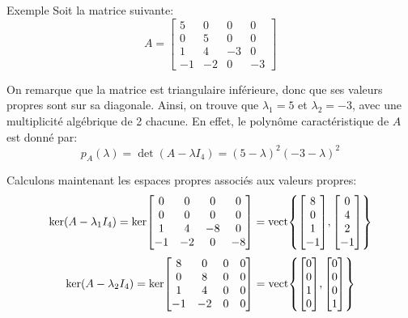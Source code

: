 \documentclass[a4paper]{article}
\begin{document}
\begin{parag}{Exemple}
    Soit la matrice suivante:
    \[A = \begin{bmatrix} 5 & 0 & 0 & 0 \\ 0 & 5 & 0 & 0 \\ 1 & 4 & -3 & 0 \\ -1 & -2 & 0 & -3 \end{bmatrix} \]

    On remarque que la matrice est triangulaire inférieure, donc que ses valeurs propres sont sur sa diagonale. Ainsi, on trouve que $\lambda_1 = 5$ et $\lambda_2 = -3$, avec une multiplicité algébrique de 2 chacune. En effet, le polynôme caractéristique de $A$ est donné par:
    \[p_A\left(\lambda\right) = \det\left(A - \lambda I_4\right) = \left(5 - \lambda\right)^2\left(-3 - \lambda\right)^2\]

    Calculons maintenant les espaces propres associés aux valeurs propres:
    \[\ker\left(A - \lambda_1 I_4\right) = \ker\begin{bmatrix} 0 & 0 & 0 & 0 \\ 0 & 0 & 0 & 0 \\ 1 & 4 & -8 & 0 \\ -1 & -2 & 0 & -8 \end{bmatrix} = \vect\left\{\begin{bmatrix} 8 \\ 0 \\ 1 \\ -1 \end{bmatrix}, \begin{bmatrix} 0 \\ 4 \\ 2 \\ -1 \end{bmatrix} \right\}\]
    \[\ker\left(A - \lambda_2 I_4\right) = \ker\begin{bmatrix} 8 & 0 & 0 & 0 \\ 0 & 8 & 0 & 0 \\ 1 & 4 & 0 & 0 \\ -1 & -2 & 0 & 0 \end{bmatrix} = \vect\left\{\begin{bmatrix} 0 \\ 0 \\ 1 \\ 0 \end{bmatrix}, \begin{bmatrix} 0 \\ 0 \\ 0 \\ 1 \end{bmatrix} \right\}\]


\end{parag}
\end{document}
